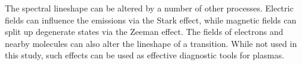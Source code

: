 The spectral lineshape can be altered by a number of other processes. Electric
fields can influence the emissions via the Stark effect, while magnetic fields
can split up degenerate states via the Zeeman effect. The fields of electrons
and nearby molecules can also alter the lineshape of a transition. While not
used in this study, such effects can be used as effective diagnostic tools for
plasmas.
